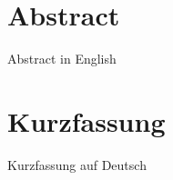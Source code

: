 


\newcommand{\TODO}[1]{\marginpar{\color{red}\emph{\small{{\bf TODO: } #1}}}}

\newpage
\chapter*{Abstract}
Abstract in English

\chapter*{Kurzfassung}
Kurzfassung auf Deutsch



\linespread{1.25}\selectfont


\tableofcontents %
\listoffigures  %
\listoftables
\blankpage









\blankpage

\begin{appendices}
	\blankpage
	
	
	
	
         
	
\end{appendices}


